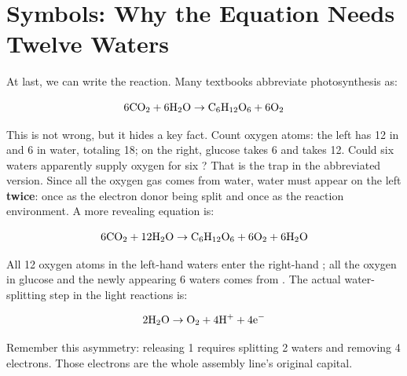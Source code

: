 \section{Symbols: Why the Equation Needs Twelve Waters}

At last, we can write the reaction. Many textbooks abbreviate photosynthesis as:

\[\mathrm{6CO_2} + \mathrm{6H_2O} \rightarrow \mathrm{C_6H_{12}O_6} + \mathrm{6O_2}\]

This is not wrong, but it hides a key fact. Count oxygen atoms: the left has 12 in  and 6 in water, totaling 18; on the right, glucose takes 6 and  takes 12. Could six waters apparently supply oxygen for six ? That is the trap in the abbreviated version. Since all the oxygen gas comes from water, water must appear on the left \textbf{twice}: once as the electron donor being split and once as the reaction environment. A more revealing equation is:

\[\mathrm{6CO_2} + \mathrm{12H_2O} \rightarrow \mathrm{C_6H_{12}O_6} + \mathrm{6O_2} + \mathrm{6H_2O}\]

All 12 oxygen atoms in the left-hand waters enter the right-hand ; all the oxygen in glucose and the newly appearing 6 waters comes from . The actual water-splitting step in the light reactions is:

\[\mathrm{2H_2O} \rightarrow \mathrm{O_2} + \mathrm{4H^+} + \mathrm{4e^-}\]

Remember this asymmetry: releasing 1  requires splitting 2 waters and removing 4 electrons. Those electrons are the whole assembly line's original capital.


